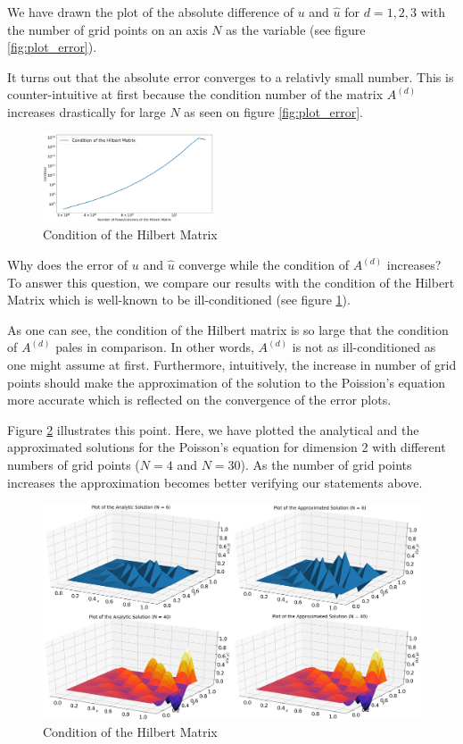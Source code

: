 \documentclass[refman]{article}
\theoremstyle{definition}
\begin{document}
We have drawn the plot of the absolute difference of \(u\) and \(\hat{u}\) for \(d = 1, 2, 3\) with the number of grid points on an axis \(N\) as the variable (see figure \ref{fig:plot_error}).

It turns out that the absolute error converges to a relativly small number. This is counter-intuitive at first because the condition number of the matrix \(A^{(d)}\) increases drastically for large \(N\) as seen on figure \ref{fig:plot_error}.

\begin{figure}
	\includegraphics[width=0.45\textwidth]{graphics/hilbert_condition.png}
	\caption{Condition of the Hilbert Matrix}
	\label{fig:hilbert_condition}
\end{figure}

Why does the error of \(u\) and \(\hat{u}\) converge while the condition of \(A^{(d)}\) increases? To answer this question, we compare our results with the condition of the Hilbert Matrix which is well-known to be ill-conditioned (see figure \ref{fig:hilbert_condition}).

As one can see, the condition of the Hilbert matrix is so large that the condition of \(A^{(d)}\) pales in comparison. In other words, \(A^{(d)}\) is not as ill-conditioned as one might assume at first. Furthermore, intuitively, the increase in number of grid points should make the approximation of the solution to the Poission's equation more accurate which is reflected on the convergence of the error plots.

Figure \ref{fig:plots} illustrates this point. Here, we have plotted the analytical and the approximated solutions for the Poisson's equation for dimension 2 with different numbers of grid points (\(N = 4\) and \(N = 30\)). As the number of grid points increases the approximation becomes better verifying our statements above.

\begin{figure}[h]
	\includegraphics[width=\linewidth]{graphics/plot.png}
	\caption{Condition of the Hilbert Matrix}
	\label{fig:plots}
\end{figure}
\bigskip
\end{document}
